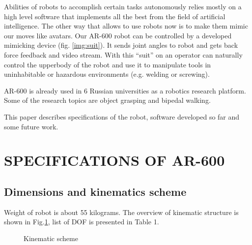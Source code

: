 \documentclass[letterpaper, 10 pt, conference]{ieeeconf}  %
\begin{document}
Abilities of robots to accomplish certain tasks autonomously relies mostly on
a high level software that implements all the best from the field of artificial
intelligence. The other way that allows to use robots now is to make them mimic
our moves like avatars. Our AR-600 robot can be controlled by a developed
mimicking device (fig. \ref{img:suit}). It sends joint angles to robot and
gets back force feedback and video stream. With this ``suit'' on an
operator can naturally control the upperbody of the robot and use it to manipulate tools in uninhabitable or hazardous environments (e.g. welding or screwing).

AR-600 is already used in 6 Russian universities as a robotics research
platform. Some of the research topics are object grasping and bipedal walking.

This paper describes specifications of the robot, software developed so far and
some future work.
\section{SPECIFICATIONS OF AR-600}

\subsection{Dimensions and kinematics scheme}

Weight of robot is about 55 kilograms.
The overview of kinematic structure is shown in Fig.\ref{img:kinematic}, list of
DOF is presented in Table 1.
 \begin{figure}[thpb]
      \centering
      \caption{Kinematic scheme}
      \label{img:kinematic}
   \end{figure}
 
\end{document}
